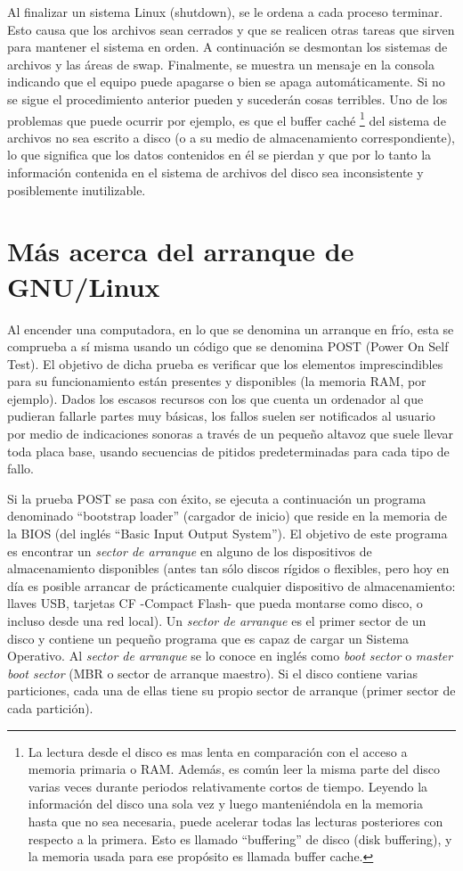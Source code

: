 \documentclass[12pt]{article}
\begin{document}
 Al finalizar un sistema Linux (shutdown), se le ordena a cada proceso
terminar. Esto causa que los archivos sean cerrados y que se realicen otras
tareas que sirven para mantener el sistema en orden. A continuación se desmontan
los sistemas de archivos y las áreas de swap. Finalmente, se muestra un mensaje
en la consola indicando que el equipo puede apagarse o bien se apaga automáticamente. 
Si no se sigue el procedimiento anterior pueden y sucederán cosas terribles. Uno de los problemas 
que puede ocurrir por ejemplo, es que el buffer caché
\footnote{La lectura desde el disco es mas lenta en comparación con el acceso a 
memoria primaria o RAM. Además, es común leer la misma parte del disco varias 
veces durante periodos relativamente cortos de tiempo. Leyendo la información del
disco una sola vez y luego manteniéndola en la memoria hasta que no sea necesaria,
puede acelerar todas las lecturas posteriores con respecto a la primera. Esto es 
llamado ``buffering'' de disco (disk buffering), y la memoria usada para ese propósito 
es llamada buffer cache.}
 del sistema de archivos no sea escrito a
disco (o a su medio de almacenamiento correspondiente), lo que significa que los
datos contenidos en él se pierdan y que por lo tanto la información contenida en
el sistema de archivos del disco sea inconsistente y posiblemente inutilizable.

\section{Más acerca del arranque de GNU/Linux}

Al encender una computadora, en lo que se denomina un arranque en frío, esta se
comprueba a sí misma usando un código que se denomina POST (Power On Self
Test). El objetivo de dicha prueba es verificar que los elementos imprescindibles
para su funcionamiento están presentes y disponibles (la memoria RAM, por
ejemplo). Dados los escasos recursos con los que cuenta un ordenador
al que pudieran fallarle partes muy básicas, los fallos suelen ser notificados al
usuario por medio de indicaciones sonoras a través de un pequeño altavoz que
suele llevar toda placa base, usando secuencias de pitidos predeterminadas para
cada tipo de fallo.

Si la prueba POST se pasa con éxito, se ejecuta a continuación un programa
denominado ``bootstrap loader'' (cargador de inicio) que reside en la memoria de la
BIOS (del inglés ``Basic Input Output System''). El objetivo de este programa 
es encontrar un \textit{sector de arranque} en alguno de
los dispositivos de almacenamiento disponibles (antes tan sólo discos rígidos o
flexibles, pero hoy en día es posible arrancar de prácticamente cualquier dispositivo
de almacenamiento: llaves USB, tarjetas CF -Compact Flash- que pueda
montarse como disco, o incluso desde una red local).
Un \textit{sector de arranque} es el primer sector de un disco y contiene un pequeño
programa  que es capaz de cargar un Sistema Operativo. Al \textit{sector de arranque} 
se lo conoce  en inglés como \textit{boot sector} o
\textit{master boot sector} (MBR o sector de arranque maestro). Si
el disco contiene varias particiones, cada una de ellas tiene su propio sector
de arranque (primer sector de cada partición).  
\end{document}
